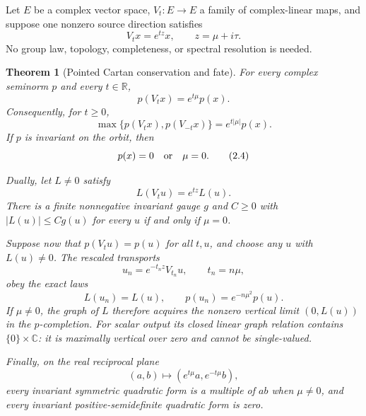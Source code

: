 \documentclass[11pt]{article}
\newtheorem{theorem}{Theorem}[section]
\theoremstyle{definition}
\theoremstyle{remark}
\newcommand{\C}{\mathbb C}
\newcommand{\R}{\mathbb R}
\begin{document}
Let \(E\) be a complex vector space, \(V_t:E\to E\) a family of
complex-linear maps, and suppose one nonzero source direction satisfies
\[
                         V_tx=e^{tz}x,
             \qquad z=\mu+i\tau.
\tag{2.1}\label{eq:vector-character}
\]
No group law, topology, completeness, or spectral resolution is needed.

\begin{theorem}[Pointed Cartan conservation and fate]
\label{thm:cartan-fate}
For every complex seminorm \(p\) and every \(t\in\R\),
\[
                         p(V_tx)=e^{t\mu}p(x).
\tag{2.2}\label{eq:primal-growth}
\]
Consequently, for \(t\ge0\),
\[
 \max\{p(V_tx),p(V_{-t}x)\}=e^{t|\mu|}p(x).
\tag{2.3}\label{eq:reflected-condition}
\]
If \(p\) is invariant on the orbit, then
\[
                         p(x)=0\quad\hbox{or}\quad\mu=0.
\tag{2.4}\label{eq:primal-alternative}
\]

Dually, let \(L\ne0\) satisfy
\[
                         L(V_tu)=e^{tz}L(u).
\tag{2.5}\label{eq:dual-character}
\]
There is a finite nonnegative invariant gauge \(g\) and \(C\ge0\) with
\(|L(u)|\le Cg(u)\) for every \(u\) if and only if \(\mu=0\).

Suppose now that \(p(V_tu)=p(u)\) for all \(t,u\), and choose any \(u\)
with \(L(u)\ne0\).  The rescaled transports
\[
 u_n=e^{-t_nz}V_{t_n}u,\qquad t_n=n\mu,
\tag{2.6}\label{eq:graph-null-sequence}
\]
obey the exact laws
\[
 L(u_n)=L(u),\qquad
 p(u_n)=e^{-n\mu^2}p(u).
\tag{2.7}\label{eq:graph-null-law}
\]
If \(\mu\ne0\), the graph of \(L\) therefore acquires the nonzero vertical
limit \((0,L(u))\) in the \(p\)-completion.  For scalar output its closed
linear graph relation contains \(\{0\}\times\C\): it is maximally vertical
over zero and cannot be single-valued.

Finally, on the real reciprocal plane
\[
                         (a,b)\longmapsto
                         (e^{t\mu}a,e^{-t\mu}b),
\tag{2.8}\label{eq:reciprocal-plane}
\]
every invariant symmetric quadratic form is a multiple of \(ab\) when
\(\mu\ne0\), and every invariant positive-semidefinite quadratic form is
zero.
\end{theorem}
\end{document}
